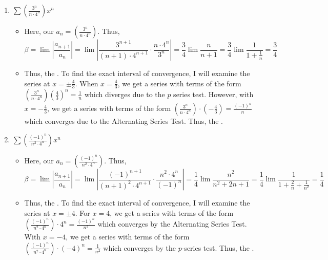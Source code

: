 \documentclass[10pt,a4paper]{article}
\theoremstyle{definition}
\begin{document}
\begin{enumerate}[label = (\alph*)]
\begin{itemize}
	\end{itemize}
\item $\displaystyle \sum \left(\frac{3^n}{n\cdot 4^n}\right)x^n$
	\begin{itemize}
	\item Here, our $\displaystyle a_n = \left(\frac{3^n}{n\cdot 4^n}\right)$. Thus,
	\[\beta = \lim \left|\frac{a_{n+1}}{a_n}\right| = \lim \left|\frac{3^{n+1}}{(n+1)\cdot 4^{n+1}} \cdot \frac{n \cdot 4^n}{3^n}\right| = \frac{3}{4} \lim \frac{n}{n + 1} = \frac{3}{4} \lim \frac{1}{1 + \frac{1}{n}} = \frac{3}{4}\]
	\item Thus, the . To find the exact interval of convergence, I will examine the series at $x = \pm \frac{4}{3}$. When $x = \frac{4}{3}$, we get a series with terms of the form $\displaystyle \left(\frac{3^n}{n\cdot 4^n}\right)\left(\frac{4}{3}\right)^n = \frac{1}{n}$ which diverges due to the $p$ series test. However, with $x = -\frac{4}{3}$, we get a series with terms of the form $\displaystyle \left(\frac{3^n}{n \cdot 4^n}\right)\cdot \left(-\frac{4}{3}\right) = \frac{(-1)^n}{n}$ which converges due to the Alternating Series Test. Thus, the \boxed{\text{Interval of Convergence is } \left[-\frac{4}{3} ,\frac{4}{3}\right)}.
	\end{itemize}
\item $\displaystyle \sum \left(\frac{(-1)^n}{n^2\cdot 4^n}\right)x^n$
	\begin{itemize}
	\item Here, our $\displaystyle a_n = \left(\frac{(-1)^n}{n^2\cdot 4^n}\right)$. Thus,
	\[\beta = \lim \left|\frac{a_{n+1}}{a_n}\right| = \lim \left|\frac{(-1)^{n+1}}{(n+1)^2 \cdot 4^{n+1}} \cdot \frac{n^2 \cdot 4^n}{(-1)^n}\right| = \frac{1}{4} \lim \frac{n^2}{n^2 + 2n + 1} = \frac{1}{4}\lim \frac{1}{1 + \frac{2}{n} + \frac{1}{n^2}} = \frac{1}{4}\]
	\item Thus, the . To find the exact interval of convergence, I will examine the series at $x = \pm 4$. For $x = 4$, we get a series with terms of the form $\displaystyle \left(\frac{(-1)^n}{n^2 \cdot 4^n}\right)\cdot 4^n = \frac{(-1)^n}{n^2}$ which converges by the Alternating Series Test. With $x = -4$, we get a series with terms of the form $\displaystyle \left(\frac{(-1)^n}{n^2 \cdot 4^n}\right)\cdot (-4)^n = \frac{1}{n^2}$ which converges by the $p$-series test. Thus, the .
	\end{itemize}
\end{enumerate}
\end{document}
